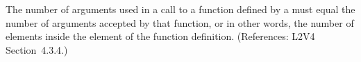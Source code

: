The number of arguments used in a call to a function defined by a
\FunctionDefinition must equal the number of arguments accepted by that
function, or in other words, the number of  elements inside the
 element of the function definition.  (References: L2V4 Section~4.3.4.)
